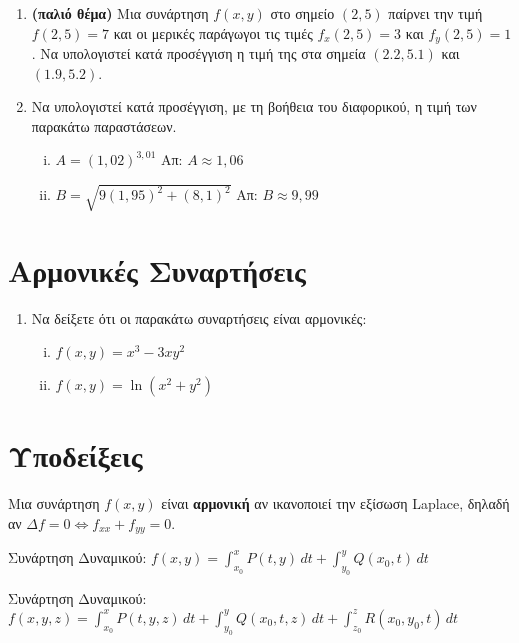 \begin{enumerate}
  \item \textbf{(παλιό θέμα)} Μια συνάρτηση $ f(x,y) $ στο σημείο $ (2,5) $ παίρνει την 
    τιμή $ f(2,5) = 7 $ και οι μερικές παράγωγοι τις τιμές $ f_{x}(2,5) = 3 $ και 
    $ f_{y}(2,5) = 1 $. Να υπολογιστεί κατά προσέγγιση η τιμή της στα σημεία 
    $ (2.2,5.1) $ και $ (1.9,5.2) $.

  \item Να υπολογιστεί κατά προσέγγιση, με τη βοήθεια του διαφορικού, η τιμή των 
   παρακάτω  παραστάσεων.
    \begin{enumerate}[i)]
      \item $A = (1,02)^{3,01} $ \hfill Απ: $ A \approx 1,06 $ 
      \item $B =  \sqrt{ 9(1,95)^{2} + (8,1)^{2} } $ 
        \hfill Απ: $ B \approx 9,99 $ 
    \end{enumerate}
\end{enumerate}


\section*{Αρμονικές Συναρτήσεις}

\begin{enumerate}

  \item Να δείξετε ότι οι παρακάτω συναρτήσεις είναι αρμονικές:
    \begin{enumerate}[(i)]
      \item $ f(x,y) = x^{3}-3xy^{2} $
      \item $ f(x,y) = \ln(x^{2} + y^{2}) $
    \end{enumerate}
\end{enumerate}

\section*{\textcolor{Col1}{Υποδείξεις}}

\begin{myitemize}
  \item Μια συνάρτηση $ f(x,y) $ είναι \textbf{αρμονική} αν ικανοποιεί την εξίσωση 
    Laplace, δηλαδή αν $ \Delta f = 0 \Leftrightarrow f_{xx}+f_{yy} = 0 $.
  \item Συνάρτηση Δυναμικού: 
    $ f(x,y) = \int_{x_{0}}^{x} P(t,y) \,{dt} + \int_{y_{0}}^{y} Q(x_{0},t) \,{dt} $ 
  \item Συνάρτηση Δυναμικού: $ f(x,y,z) = \int _{x_{0}}^{x} P(t,y,z) \,{dt} + 
    \int _{y_{0}}^{y} Q(x_{0},t,z) \,{dt} + \int _{z_{0}}^{z} R(x_{0}, y_{0},t) \,{dt} $
\end{myitemize}


